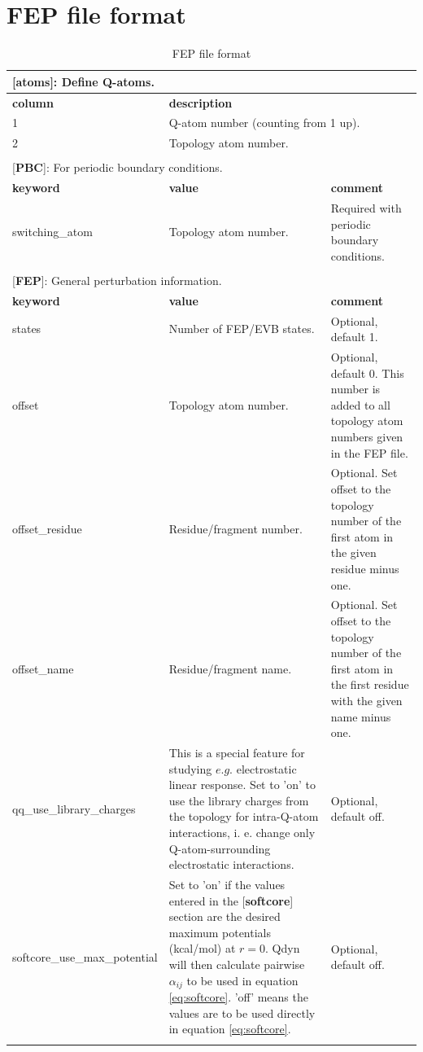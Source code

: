 \documentclass[10pt,oneside,pdftex]{article}
\begin{document}
\section{FEP file format}
\small
\begin{longtable}{|p{53pt}|p{181pt}|p{160pt}|}
\caption{FEP file format}
\label{tab:fepfileformat}
\endhead

\multicolumn{3}{p{394pt}}{[\textbf{atoms}]: Define Q-atoms.}\\
\hline \textbf{column} & \multicolumn{2}{p{341pt}|}{\textbf{description}}\\
\hline 1 & \multicolumn{2}{p{341pt}|}{Q-atom number (counting from 1 up).}\\
\hline 2 & \multicolumn{2}{p{341pt}|}{Topology atom number.}\\
\hline
\multicolumn{3}{p{394pt}}{}\\



\multicolumn{3}{p{394pt}}{[\textbf{PBC}]: For periodic boundary conditions.}\\
\hline \textbf{keyword} & \textbf{value} & \textbf{comment}\\
\hline switching\-\_atom & Topology atom number. & Required with periodic boundary conditions.\\
\hline
\multicolumn{3}{p{394pt}}{}\\

\multicolumn{3}{p{394pt}}{[\textbf{FEP}]: General perturbation information.}\\
\hline \textbf{keyword} & \textbf{value} & \textbf{comment}\\
\hline states & Number of FEP/EVB states. & Optional, default 1.\\
\hline offset & Topology atom number. & Optional, default 0. This number is  added to all topology atom numbers given in the FEP file.\\
\hline offset\_residue & Residue/fragment number. & Optional. Set offset to the topology number of the first atom in the given residue minus one.\\
\hline offset\_name & Residue/fragment name. & Optional. Set offset to the topology number of the first atom in the first residue with the given name minus one.\\
\hline qq\_use\-\_library\-\_charges & This is a special feature for studying $e.g.$ electrostatic linear response. Set to 'on' to use the library charges from the topology for intra-Q-atom interactions, i. e. change only Q-atom-surrounding electrostatic interactions. &Optional, default off.\\
\hline softcore\-\_use\-\_max\-\_potential & Set to 'on' if the values entered in the [\textbf{softcore}] section are the desired maximum potentials (kcal/mol) at $r=0$. Qdyn will then calculate pairwise $\alpha_{ij}$ to be used in equation \ref{eq:softcore}. 'off' means the values are to be used directly in equation \ref{eq:softcore}.&Optional, default off.\\
\hline
\multicolumn{3}{p{394pt}}{}\\


\end{longtable}
\end{document}

